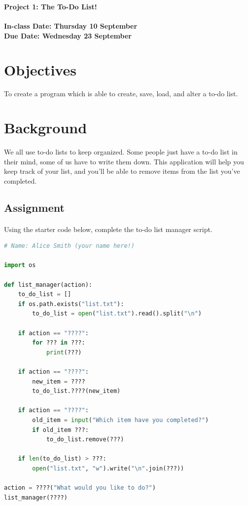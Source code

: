 \documentclass[letter,10pt]{article}
\begin{document}
    
    \huge
    \textbf{Project 1: The To-Do List!}
    \normalsize
    \\ ~~ \\
    \textbf{In-class Date: Thursday 10 September} \\
    \textbf{Due Date: Wednesday 23 September}
    
    \section*{Objectives}
    \paragraph{}To create a program which is able to create, save, load, and alter a to-do list.
    
    \section*{Background}
    \paragraph{}We all use to-do lists to keep organized. Some people just have a to-do list in their mind, some of us have to write them down. This application will help you keep track of your list, and you'll be able to remove items from the list you've completed.
    
    \subsection*{Assignment}
    \paragraph{}Using the starter code below, complete the to-do list manager script.
    
    \begin{lstlisting}[language=python]
# Name: Alice Smith (your name here!)

import os

def list_manager(action):
    to_do_list = []
    if os.path.exists("list.txt"):
        to_do_list = open("list.txt").read().split("\n")
    
    if action == "????":
        for ??? in ???:
            print(???)
    
    if action == "????":
        new_item = ????
        to_do_list.????(new_item)
    
    if action == "????":
        old_item = input("Which item have you completed?")
        if old_item ???:
            to_do_list.remove(???)
    
    if len(to_do_list) > ???:
        open("list.txt", "w").write("\n".join(???))
    
action = ????("What would you like to do?")
list_manager(????)
    \end{lstlisting}
    
\end{document}
